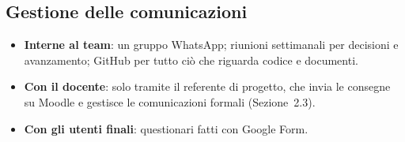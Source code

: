 \subsection{Gestione delle comunicazioni}
\begin{itemize}
    \item \textbf{Interne al team}: un gruppo WhatsApp; riunioni settimanali per decisioni e avanzamento; GitHub  per tutto ciò che riguarda codice e documenti.
    \item \textbf{Con il docente}: solo tramite il referente di progetto, che invia le consegne su Moodle e gestisce le comunicazioni formali (Sezione~2.3).
    \item \textbf{Con gli utenti finali}: questionari fatti con Google Form.
\end{itemize}

